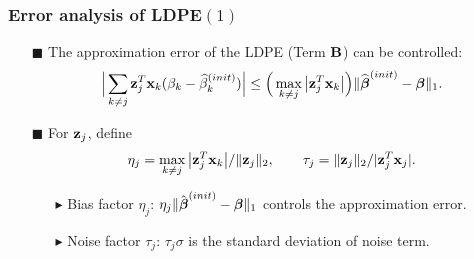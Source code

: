 \begin{frame}
\frametitle{Error analysis of LDPE$(1)$}
\begin{itemize}

\item[$\blacksquare$] The approximation error of the LDPE (Term $\mbox{\bf B}$) can be controlled:
\begin{equation}
\Big|\sum_{k\neq j}\mbox{\bf z}_j^T\mbox{\bf x}_k(\beta_k-\widehat\beta_k^{(init)})\Big|
\le \Big(\max_{k\neq j}\big|\mbox{\bf z}_j^T\mbox{\bf x}_k\big|\Big)\|\widehat{\mbox{\boldmath $\beta$}}^{(init)}-\mbox{\boldmath $\beta$}\|_1.
\end{equation}
\item[$\blacksquare$] For $\mbox{\bf z}_{j}$, define
\begin{equation}
\label{defetatau}
\eta_j = \max_{k\neq j}\big|\mbox{\bf z}_j^T\mbox{\bf x}_k\big|/\|\mbox{\bf z}_j\|_2,\qquad \tau_j = \|\mbox{\bf z}_j\|_2/|\mbox{\bf z}_j^T\mbox{\bf x}_j|.
\end{equation}
   \begin{itemize}
   \item[$\blacktriangleright$] Bias factor $\eta_{j}$: $\eta_{j} \|\hat{\mbox{\boldmath $\beta$}}^{(init)}-\mbox{\boldmath $\beta$}\|_{1}$ controls the approximation error.
   \item[$\blacktriangleright$] Noise factor $\tau_{j}$: $\tau_{j} \sigma$ is the standard deviation of noise term.
   \end{itemize}

\end{itemize}


\end{frame}


